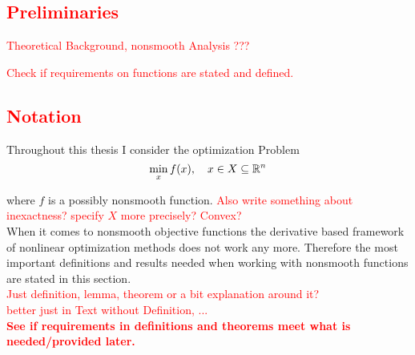 \textcolor{red}{\section{Preliminaries}}

\textcolor{red}{Theoretical Background, nonsmooth Analysis ???}

\textcolor{red}{Check if requirements on functions are stated and defined.}\\

\textcolor{red}{\subsection{Notation}}

Throughout this thesis I consider the optimization Problem 
\begin{equation}
\min_{x} f(x), \quad x \in X \subseteq \mathbb{R}^n
\label{min_prob}
\end{equation}

where \(f\) is a possibly nonsmooth function. %
\textcolor{red}{Also write something about inexactness? specify \(X\) more precisely? Convex?} \\
When it comes to nonsmooth objective functions the  derivative based framework of nonlinear optimization methods does not work any more. Therefore the most important definitions and results needed when working with nonsmooth functions are stated in this section. \\
\textcolor{red}{Just definition, lemma, theorem or a bit explanation around it?\\
better just in Text without Definition, ...} \\
\textbf{\textcolor{red}{See if requirements in definitions and theorems meet what is needed/provided later.}} \\


